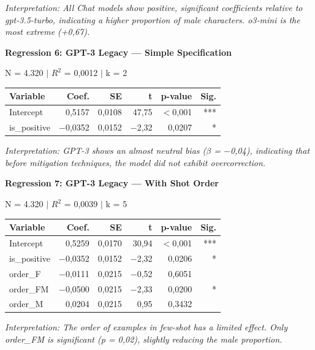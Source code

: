 \documentclass[12pt,a4paper]{article}
\begin{document}
\noindent\textit{Interpretation: All Chat models show positive, significant coefficients
relative to gpt-3.5-turbo, indicating a higher proportion of
male characters. o3-mini is the most extreme (+0,67).}

\vspace{0.5cm}
\noindent\textbf{Regression 6: GPT-3 Legacy --- Simple Specification}

\noindent N = 4.320 $|$ $R^2$ = 0,0012 $|$ k = 2

\begin{table}[H]
\centering
\begin{tabular}{lrrrrr}
\toprule
\textbf{Variable} & \textbf{Coef.} & \textbf{SE} & \textbf{t} & \textbf{p-value} & \textbf{Sig.} \\
\midrule
Intercept & 0,5157 & 0,0108 & 47,75 & $<$0,001 & *** \\
is\_positive & $-$0,0352 & 0,0152 & $-$2,32 & 0,0207 & * \\
\bottomrule
\end{tabular}
\end{table}

\noindent\textit{Interpretation: GPT-3 shows an almost neutral bias ($\beta$ = $-$0,04), indicating
that before mitigation techniques, the model did not exhibit
overcorrection.}

\vspace{0.5cm}
\noindent\textbf{Regression 7: GPT-3 Legacy --- With Shot Order}

\noindent N = 4.320 $|$ $R^2$ = 0,0039 $|$ k = 5

\begin{table}[H]
\centering
\begin{tabular}{lrrrrr}
\toprule
\textbf{Variable} & \textbf{Coef.} & \textbf{SE} & \textbf{t} & \textbf{p-value} & \textbf{Sig.} \\
\midrule
Intercept & 0,5259 & 0,0170 & 30,94 & $<$0,001 & *** \\
is\_positive & $-$0,0352 & 0,0152 & $-$2,32 & 0,0206 & * \\
order\_F & $-$0,0111 & 0,0215 & $-$0,52 & 0,6051 & \\
order\_FM & $-$0,0500 & 0,0215 & $-$2,33 & 0,0200 & * \\
order\_M & 0,0204 & 0,0215 & 0,95 & 0,3432 & \\
\bottomrule
\end{tabular}
\end{table}

\noindent\textit{Interpretation: The order of examples in few-shot has a limited effect.
Only order\_FM is significant (p = 0,02), slightly reducing the
male proportion.}
\end{document}
